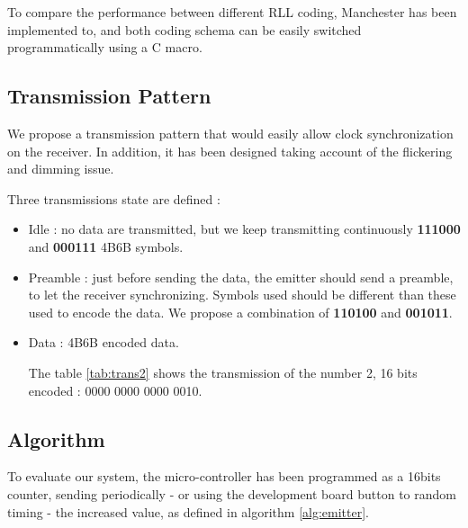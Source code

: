 To compare the performance between different RLL coding, Manchester has been implemented to, and both coding schema can be easily switched programmatically using a C macro.

\subsection{Transmission Pattern} \label{frame}

We propose a transmission pattern that would easily allow clock synchronization on the receiver. In addition, it has been designed taking account of the flickering and dimming issue.

Three transmissions state are defined : 
\begin{itemize}
\item Idle : no data are transmitted, but we keep transmitting continuously \textbf{111000} and \textbf{000111} 4B6B symbols.
\item Preamble : just before sending the data, the emitter should send a preamble, to let the receiver synchronizing. Symbols used should be different than these used to encode the data. We propose a combination of \textbf{110100} and \textbf{001011}.
\item Data : 4B6B encoded data.

The table \ref{tab:trans2} shows the transmission of the number 2, 16 bits encoded : 0000 0000 0000 0010.

\begin{table}[htbp]
  \caption{A transmission example : 2 16 bits}
  \begin{center}
  \end{center}

  \label{tab:trans2}
\end{table}


\end{itemize}
\subsection{Algorithm}
To evaluate our system, the micro-controller has been programmed as a 16bits counter, sending periodically - or using the development board button to random timing - the increased value, as defined in algorithm \ref{alg:emitter}.

